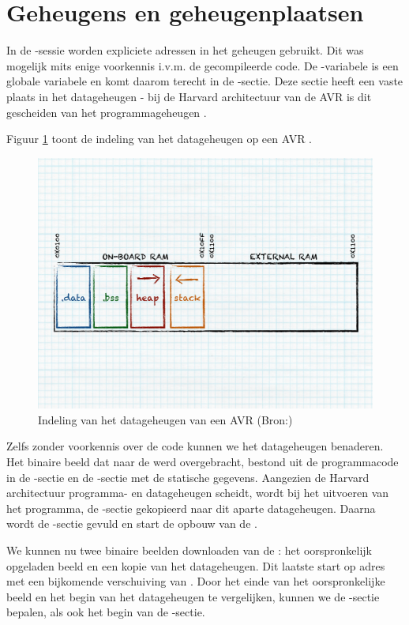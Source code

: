 \section{Geheugens en geheugenplaatsen}

In de -sessie worden expliciete adressen in het geheugen gebruikt. Dit
was mogelijk mits enige voorkennis i.v.m. de gecompileerde code. De
-variabele is een globale variabele en komt daarom terecht in de
-sectie. Deze sectie heeft een vaste plaats in het datageheugen - bij
de Harvard architectuur van de AVR \mcu is dit gescheiden van het
programmageheugen \citep{avr-memory}.

\noindent Figuur \ref{fig:avr-ram-map} toont de indeling van het datageheugen
op een AVR \mcu.

\begin{figure}[ht]
  \centering
  \includegraphics[width=0.9\linewidth]{resources/avr-ram-map.pdf}
  \caption[Indeling van het datageheugen van een AVR \mcu]{Indeling van het
  datageheugen van een AVR \mcu (Bron:\citep{avr-malloc})}
  \label{fig:avr-ram-map}
\end{figure}

Zelfs zonder voorkennis over de code kunnen we het datageheugen benaderen. Het
binaire beeld dat naar de \mcu werd overgebracht, bestond uit de programmacode
in de -sectie en de -sectie met de statische gegevens.
Aangezien de Harvard architectuur programma- en datageheugen scheidt, wordt bij
het uitvoeren van het programma, de -sectie gekopieerd naar dit
aparte datageheugen. Daarna wordt de -sectie gevuld en start de
opbouw van de .

We kunnen nu twee binaire beelden downloaden van de \mcu: het oorspronkelijk
opgeladen beeld en een kopie van het datageheugen. Dit laatste start op adres
 met een bijkomende verschuiving van . Door het einde
van het oorspronkelijke beeld en het begin van het datageheugen te vergelijken,
kunnen we de -sectie bepalen, als ook het begin van de
-sectie.

